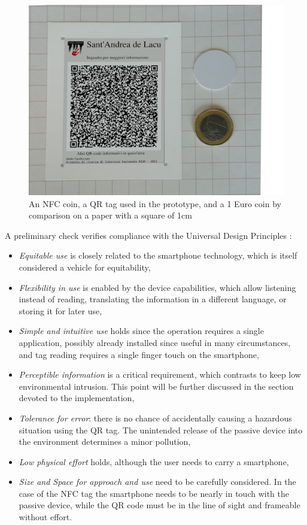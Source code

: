 \documentclass[sustainability,article,submit,pdftex,moreauthors]{Definitions/mdpi}
\begin{document}
\begin{figure}
	\centering
	\includegraphics[width=0.9\linewidth]{figure/qr+NFC+coin}
	\caption[Passive devices dimensions]{An NFC coin, a QR tag used in the prototype, and a 1 Euro coin by comparison on a paper with a square of 1cm}
	\label{fig:qrnfccoin}
\end{figure}

A preliminary check verifies compliance with the Universal Design Principles \cite{udi97a}:

\begin{itemize}
	\item {\em Equitable use} is closely related to the smartphone technology, which is itself considered a vehicle for equitability,
	\item {\em Flexibility in use} is enabled by the device capabilities, which allow listening instead of reading, translating the information in a different language, or storing it for later use,
	\item {\em Simple and intuitive use} holds since the operation requires a single application, possibly already installed since useful in many circumstances, and tag reading requires a single finger touch on the smartphone,
	\item{\em Perceptible information} is a critical requirement, which contrasts to keep low environmental intrusion. This point will be further discussed in the section devoted to the implementation,
	\item{\em Tolerance for error}: there is no chance of accidentally causing a hazardous situation using the QR tag. The unintended release of the passive device into the environment determines a minor pollution,
	\item{\em Low physical effort} holds, although the user needs to carry a smartphone,
	\item{\em Size and Space for approach and use} need to be carefully considered. In the case of the NFC tag the smartphone needs to be nearly in touch with the passive device, while the QR code must be in the line of sight and frameable without effort.
\end{itemize}
\end{document}

